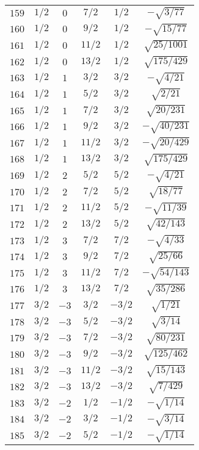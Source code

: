 \begin{table}
\begin{center}
\begin{tabular}{|c|c|c|c|c|c|}
$159$ & $1/2$ & $0$ & $7/2$ & $1/2$ & $-\sqrt{3/77}$ \\ 
$160$ & $1/2$ & $0$ & $9/2$ & $1/2$ & $-\sqrt{15/77}$ \\ 
$161$ & $1/2$ & $0$ & $11/2$ & $1/2$ & $\sqrt{25/1001}$ \\ 
$162$ & $1/2$ & $0$ & $13/2$ & $1/2$ & $\sqrt{175/429}$ \\ 
$163$ & $1/2$ & $1$ & $3/2$ & $3/2$ & $-\sqrt{4/21}$ \\ 
$164$ & $1/2$ & $1$ & $5/2$ & $3/2$ & $\sqrt{2/21}$ \\ 
$165$ & $1/2$ & $1$ & $7/2$ & $3/2$ & $\sqrt{20/231}$ \\ 
$166$ & $1/2$ & $1$ & $9/2$ & $3/2$ & $-\sqrt{40/231}$ \\ 
$167$ & $1/2$ & $1$ & $11/2$ & $3/2$ & $-\sqrt{20/429}$ \\ 
$168$ & $1/2$ & $1$ & $13/2$ & $3/2$ & $\sqrt{175/429}$ \\ 
$169$ & $1/2$ & $2$ & $5/2$ & $5/2$ & $-\sqrt{4/21}$ \\ 
$170$ & $1/2$ & $2$ & $7/2$ & $5/2$ & $\sqrt{18/77}$ \\ 
$171$ & $1/2$ & $2$ & $11/2$ & $5/2$ & $-\sqrt{11/39}$ \\ 
$172$ & $1/2$ & $2$ & $13/2$ & $5/2$ & $\sqrt{42/143}$ \\ 
$173$ & $1/2$ & $3$ & $7/2$ & $7/2$ & $-\sqrt{4/33}$ \\ 
$174$ & $1/2$ & $3$ & $9/2$ & $7/2$ & $\sqrt{25/66}$ \\ 
$175$ & $1/2$ & $3$ & $11/2$ & $7/2$ & $-\sqrt{54/143}$ \\ 
$176$ & $1/2$ & $3$ & $13/2$ & $7/2$ & $\sqrt{35/286}$ \\ 
$177$ & $3/2$ & $-3$ & $3/2$ & $-3/2$ & $\sqrt{1/21}$ \\ 
$178$ & $3/2$ & $-3$ & $5/2$ & $-3/2$ & $\sqrt{3/14}$ \\ 
$179$ & $3/2$ & $-3$ & $7/2$ & $-3/2$ & $\sqrt{80/231}$ \\ 
$180$ & $3/2$ & $-3$ & $9/2$ & $-3/2$ & $\sqrt{125/462}$ \\ 
$181$ & $3/2$ & $-3$ & $11/2$ & $-3/2$ & $\sqrt{15/143}$ \\ 
$182$ & $3/2$ & $-3$ & $13/2$ & $-3/2$ & $\sqrt{7/429}$ \\ 
$183$ & $3/2$ & $-2$ & $1/2$ & $-1/2$ & $-\sqrt{1/14}$ \\ 
$184$ & $3/2$ & $-2$ & $3/2$ & $-1/2$ & $-\sqrt{3/14}$ \\ 
$185$ & $3/2$ & $-2$ & $5/2$ & $-1/2$ & $-\sqrt{1/14}$ \\ 

\end{tabular}
\end{center}
\end{table}
